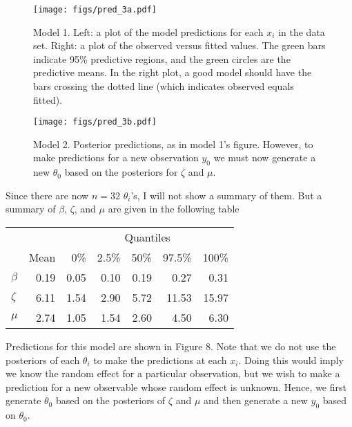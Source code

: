 \documentclass[12pt]{article}
\begin{document}
\newpage

\begin{figure}[H]
\begin{center}
\texttt{[image: figs/pred\_3a.pdf]}
\caption{Model 1. Left: a plot of the model predictions for each $x_i$ in the data set. Right: a plot of the observed versus fitted values. The green bars indicate 95\% predictive regions, and the green circles are the predictive means. In the right plot, a good model should have the bars crossing the dotted line (which indicates observed equals fitted).}
\end{center}
\end{figure}

\begin{figure}[H]
\begin{center}
\texttt{[image: figs/pred\_3b.pdf]}
\caption{Model 2. Posterior predictions, as in model 1's figure. However, to make predictions for a new observation $y_0$ we must now generate a new $\theta_0$ based on the posteriors for $\zeta$ and $\mu$.}
\end{center}
\end{figure}

\newpage

Since there are now $n=32$ $\theta_i$'s, I will not show a summary of them. But a summary of $\beta$, $\zeta$, and $\mu$ are given in the following table

\begin{center}
\begin{tabular}{lrrrrrr}
         &      & \multicolumn{5}{c}{Quantiles} \\
         & Mean & \multicolumn{1}{|r}{0\%}  & 2.5\% & 50\% & 97.5\% & 100\% \\ \hline\hline
 $\beta$ & 0.19 & 0.05 & 0.10 & 0.19 &  0.27 &  0.31 \\
 $\zeta$ & 6.11 & 1.54 & 2.90 & 5.72 & 11.53 & 15.97 \\
 $\mu$   & 2.74 & 1.05 & 1.54 & 2.60 &  4.50 &  6.30 \\ \hline
\end{tabular}
\end{center}
Predictions for this model are shown in Figure 8. Note that we do not use the posteriors of each $\theta_i$ to make the predictions at each $x_i$. Doing this would imply we know the random effect for a particular observation, but we wish to make a prediction for a new observable whose random effect is unknown. Hence, we first generate $\theta_0$ based on the posteriors of $\zeta$ and $\mu$ and then generate a new $y_0$ based on $\theta_0$.
\end{document}
